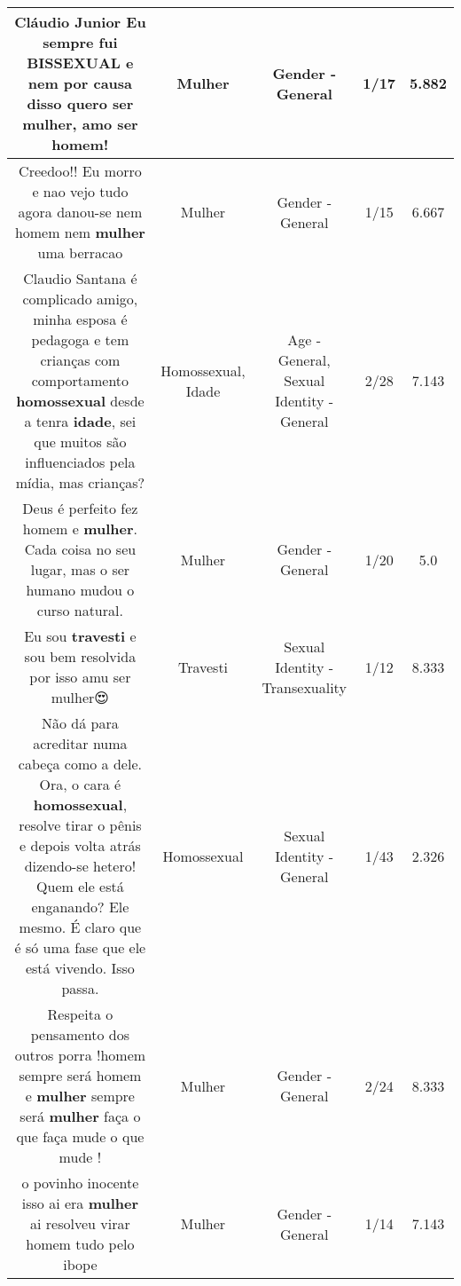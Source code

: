 \documentclass[11pt]{article}
\newlength\mylength
\begin{document}
\begin{center}
\begin{longtable}{|C{.65\mylength}|C{.30\mylength}|C{.12\mylength}|C{.12\mylength}|C{.12\mylength}|}
  \small Cláudio Junior Eu sempre fui  BISSEXUAL e nem por causa disso quero ser \textbf{mulher}, amo ser homem!\normalsize   & Mulher & Gender - General & 1/17 & 5.882 \\  \hline
  \small Creedoo!! Eu morro e nao vejo tudo agora danou-se nem homem nem \textbf{mulher} uma berracao\normalsize   & Mulher & Gender - General & 1/15 & 6.667 \\  \hline
  \small Claudio Santana é complicado amigo, minha esposa é pedagoga e tem crianças com comportamento \textbf{homossexual} desde a tenra \textbf{idade}, sei que muitos são influenciados pela mídia, mas crianças?\normalsize   & Homossexual, Idade & Age - General, Sexual Identity - General & 2/28 & 7.143 \\  \hline
  \small Deus é perfeito fez homem e \textbf{mulher}. Cada coisa no seu lugar, mas o ser humano mudou o curso natural.\normalsize   & Mulher & Gender - General & 1/20 & 5.0 \\  \hline
  \small Eu sou \textbf{travesti} e sou bem resolvida por isso amu ser mulher😍\normalsize   & Travesti & Sexual Identity - Transexuality & 1/12 & 8.333 \\  \hline
  \small Não dá para acreditar numa cabeça como a dele. Ora, o cara é \textbf{homossexual}, resolve tirar o pênis e depois volta atrás dizendo-se hetero! Quem ele está enganando? Ele mesmo. É claro que é só uma fase que ele está vivendo. Isso passa.\normalsize   & Homossexual & Sexual Identity - General & 1/43 & 2.326 \\  \hline
  \small Respeita o pensamento dos outros porra !homem sempre será homem e \textbf{mulher} sempre será \textbf{mulher} faça  o que faça mude o que mude !\normalsize   & Mulher & Gender - General & 2/24 & 8.333 \\  \hline
  \small o povinho inocente isso ai era \textbf{mulher} ai resolveu virar homem tudo pelo ibope\normalsize   & Mulher & Gender - General & 1/14 & 7.143 \\  \hline

\end{longtable}
\end{center}
\end{document}
